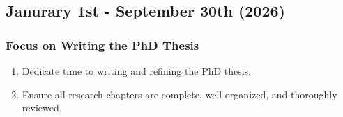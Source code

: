 \subsection{Janurary 1st - September 30th (2026)}
\subsubsection{Focus on Writing the PhD Thesis}
\begin{enumerate}
    \item Dedicate time to writing and refining the PhD thesis.
    \item Ensure all research chapters are complete, well-organized, and thoroughly reviewed.
\end{enumerate}








